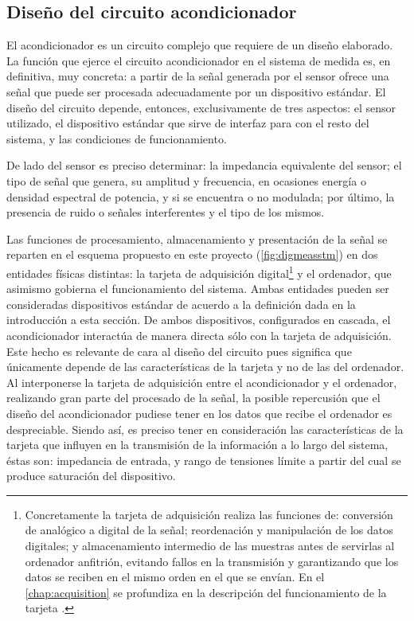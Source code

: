 \subsection{Diseño del circuito acondicionador}

El acondicionador es un circuito complejo que requiere de un diseño
elaborado. La función que ejerce el circuito acondicionador en el sistema
de medida es, en definitiva, muy concreta: a partir de la señal generada
por el sensor ofrece una señal que puede ser procesada adecuadamente por un
dispositivo estándar. El diseño del circuito depende, entonces,
exclusivamente de tres aspectos: el sensor utilizado, el dispositivo
estándar que sirve de interfaz para con el resto del sistema, y las
condiciones de funcionamiento.

De lado del sensor es preciso determinar: la impedancia equivalente del
sensor; el tipo de señal que genera, su amplitud y frecuencia, en ocasiones
energía o densidad espectral de potencia, y si se encuentra o no modulada;
por último, la presencia de ruido o señales interferentes y el tipo de los
mismos.

Las funciones de procesamiento, almacenamiento y presentación de la señal
se reparten en el esquema propuesto en este proyecto
(\vref{fig:digmeasstm}) en dos entidades físicas distintas: la tarjeta de
adquisición digital\footnote{Concretamente la tarjeta de adquisición
realiza las funciones de: conversión de analógico a digital de la señal;
reordenación y manipulación de los datos digitales; y almacenamiento
intermedio de las muestras antes de servirlas al ordenador anfitrión,
evitando fallos en la transmisión y garantizando que los datos se reciben
en el mismo orden en el que se envían. En el \cref{chap:acquisition} se
profundiza en la descripción del funcionamiento de la tarjeta \kpci{}.} y
el ordenador, que asimismo gobierna el funcionamiento del sistema. Ambas
entidades pueden ser consideradas dispositivos estándar de acuerdo a la
definición dada en la introducción a esta sección. De ambos dispositivos,
configurados en cascada, el acondicionador interactúa de manera directa
sólo con la tarjeta de adquisición. Este hecho es relevante de cara al
diseño del circuito pues significa que únicamente depende de las
características de la tarjeta y no de las del ordenador. Al interponerse la
tarjeta de adquisición entre el acondicionador y el ordenador, realizando
gran parte del procesado de la señal, la posible repercusión que el diseño
del acondicionador pudiese tener en los datos que recibe el ordenador es
despreciable. Siendo así, es preciso tener en consideración las
características de la tarjeta que influyen en la transmisión de la
información a lo largo del sistema, éstas son: impedancia de entrada, y
rango de tensiones límite a partir del cual se produce saturación del
dispositivo.

